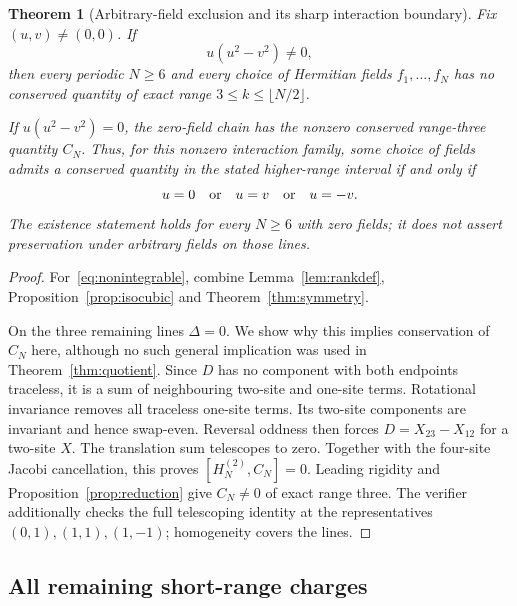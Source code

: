 \documentclass[11pt,a4paper]{article}
\numberwithin{equation}{section}
\newtheorem{theorem}{Theorem}[section]
\theoremstyle{definition}\newtheorem{definition}[theorem]{Definition}
\theoremstyle{remark}\newtheorem{remark}[theorem]{Remark}
\begin{document}
\begin{theorem}[Arbitrary-field exclusion and its sharp interaction boundary]\label{thm:blbq}
Fix $(u,v)\ne(0,0)$. If
\begin{equation}\label{eq:nonintegrable}
 u(u^2-v^2)\ne0,
\end{equation}
then every periodic $N\ge6$ and every choice of Hermitian fields $f_1,\ldots,f_N$ has no conserved quantity of exact range $3\le k\le\lfloor N/2\rfloor$.

If $u(u^2-v^2)=0$, the zero-field chain has the nonzero conserved range-three quantity $C_N$. Thus, for this nonzero interaction family, \emph{some choice of fields admits a conserved quantity in the stated higher-range interval if and only if}
\[
 u=0\quad\hbox{or}\quad u=v\quad\hbox{or}\quad u=-v.
\]
The existence statement holds for every $N\ge6$ with zero fields; it does not assert preservation under arbitrary fields on those lines.
\end{theorem}
\begin{proof}
For~\eqref{eq:nonintegrable}, combine Lemma~\ref{lem:rankdef}, Proposition~\ref{prop:isocubic} and Theorem~\ref{thm:symmetry}.

On the three remaining lines $\Delta=0$. We show why this implies conservation of $C_N$ here, although no such general implication was used in Theorem~\ref{thm:quotient}. Since $D$ has no component with both endpoints traceless, it is a sum of neighbouring two-site and one-site terms. Rotational invariance removes all traceless one-site terms. Its two-site components are invariant and hence swap-even. Reversal oddness then forces $D=X_{23}-X_{12}$ for a two-site $X$. The translation sum telescopes to zero. Together with the four-site Jacobi cancellation, this proves $[H_N^{(2)},C_N]=0$. Leading rigidity and Proposition~\ref{prop:reduction} give $C_N\ne0$ of exact range three. The verifier additionally checks the full telescoping identity at the representatives $(0,1),(1,1),(1,-1)$; homogeneity covers the lines.
\end{proof}

\subsection{All remaining short-range charges}
\end{document}
